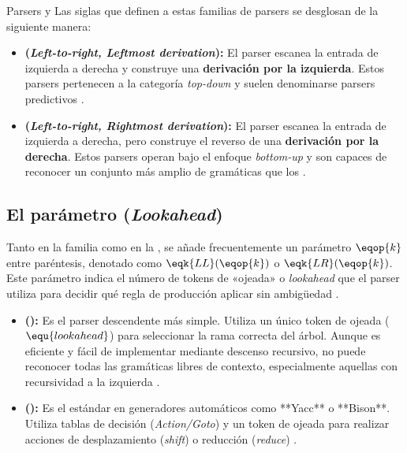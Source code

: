 \begin{definicion}{Parsers  y }
Las siglas que definen a estas familias de parsers se desglosan de la siguiente manera:
\begin{itemize}
    \item \textbf{ (\textit{Left-to-right, Leftmost derivation}):} El parser escanea la entrada de izquierda a derecha y construye una \textbf{derivación por la izquierda}. Estos parsers pertenecen a la categoría \textit{top-down} y suelen denominarse parsers predictivos \cite{aho2006compilers}.
    \item \textbf{ (\textit{Left-to-right, Rightmost derivation}):} El parser escanea la entrada de izquierda a derecha, pero construye el reverso de una \textbf{derivación por la derecha}. Estos parsers operan bajo el enfoque \textit{bottom-up} y son capaces de reconocer un conjunto más amplio de gramáticas que los  \cite{aho2006compilers}.
\end{itemize}
\end{definicion}

\subsection*{El parámetro  (\textit{Lookahead})}

Tanto en la familia  como en la , se añade frecuentemente un parámetro $\eqop{k}$ entre paréntesis, denotado como $\eqk{LL}(\eqop{k})$ o $\eqk{LR}(\eqop{k})$. Este parámetro indica el número de tokens de «ojeada» o \textit{lookahead} que el parser utiliza para decidir qué regla de producción aplicar sin ambigüedad \cite{aho2006compilers}.

\begin{itemize}
    \item \textbf{():} Es el parser descendente más simple. Utiliza un único token de ojeada ($\equ{lookahead}$) para seleccionar la rama correcta del árbol. Aunque es eficiente y fácil de implementar mediante descenso recursivo, no puede reconocer todas las gramáticas libres de contexto, especialmente aquellas con recursividad a la izquierda \cite{aho2006compilers}.
    \item \textbf{():} Es el estándar en generadores automáticos como **Yacc** o **Bison**. Utiliza tablas de decisión (\textit{Action/Goto}) y un token de ojeada para realizar acciones de desplazamiento (\textit{shift}) o reducción (\textit{reduce}) \cite{aho2006compilers}.
\end{itemize}

